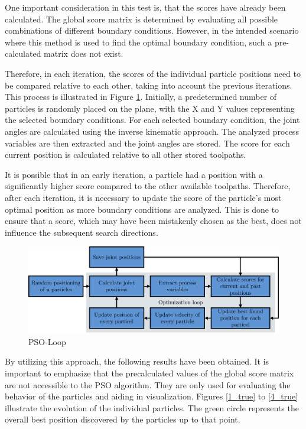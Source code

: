 One important consideration in this test is, that the scores have already been calculated. The global score matrix is determined by evaluating all possible combinations of different boundary conditions. However, in the intended scenario where this method is used to find the optimal boundary condition, such a pre-calculated matrix does not exist.

Therefore, in each iteration, the scores of the individual particle positions need to be compared relative to each other, taking into account the previous iterations. This process is illustrated in Figure \ref{swarmloop}. Initially, a predetermined number of particles is randomly placed on the plane, with the X and Y values representing the selected boundary conditions. For each selected boundary condition, the joint angles are calculated using the inverse kinematic approach. The analyzed process variables are then extracted and the joint angles are stored. The score for each current position is calculated relative to all other stored toolpaths.

It is possible that in an early iteration, a particle had a position with a significantly higher score compared to the other available toolpaths. Therefore, after each iteration, it is necessary to update the score of the particle's most optimal position as more boundary conditions are analyzed. This is done to ensure that a score, which may have been mistakenly chosen as the best, does not influence the subsequent search directions.

\begin{figure}[H]
	\centerline{\includegraphics[width=1\textwidth]{figures/swarmloop.png}}
	\caption{PSO-Loop}
	\label{swarmloop}
\end{figure}

By utilizing this approach, the following results have been obtained. It is important to emphasize that the precalculated values of the global score matrix are not accessible to the \acrshort{PSO} algorithm. They are only used for evaluating the behavior of the particles and aiding in visualization. Figures \ref{1_true} to \ref{4_true} illustrate the evolution of the individual particles. The green circle represents the overall best position discovered by the particles up to that point.\newpage


